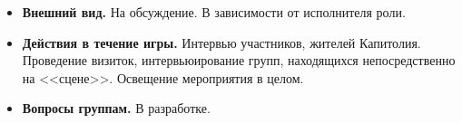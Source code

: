 
\begin{itemize}
\item \textbf{Внешний вид.} На обсуждение. В зависимости от исполнителя роли.

\item \textbf{Действия в течение игры.} Интервью участников, жителей Капитолия. Проведение визиток, интервьюирование  групп, находящихся непосредственно на <<сцене>>. Освещение мероприятия в целом.

\item \textbf{Вопросы группам.} В разработке.
\end{itemize}